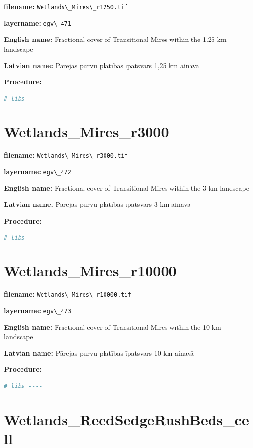\documentclass[
]{book}
\newcommand{\passthrough}[1]{#1}
\begin{document}
\textbf{filename:} \passthrough{\lstinline!Wetlands\_Mires\_r1250.tif!}

\textbf{layername:} \passthrough{\lstinline!egv\_471!}

\textbf{English name:} Fractional cover of Transitional Mires within the 1.25 km landscape

\textbf{Latvian name:} Pārejas purvu platības īpatsvars 1,25 km ainavā

\textbf{Procedure:}

\begin{lstlisting}[language=R]
# libs ----
\end{lstlisting}

\section{Wetlands\_Mires\_r3000}\label{ch06.472}

\textbf{filename:} \passthrough{\lstinline!Wetlands\_Mires\_r3000.tif!}

\textbf{layername:} \passthrough{\lstinline!egv\_472!}

\textbf{English name:} Fractional cover of Transitional Mires within the 3 km landscape

\textbf{Latvian name:} Pārejas purvu platības īpatsvars 3 km ainavā

\textbf{Procedure:}

\begin{lstlisting}[language=R]
# libs ----
\end{lstlisting}

\section{Wetlands\_Mires\_r10000}\label{ch06.473}

\textbf{filename:} \passthrough{\lstinline!Wetlands\_Mires\_r10000.tif!}

\textbf{layername:} \passthrough{\lstinline!egv\_473!}

\textbf{English name:} Fractional cover of Transitional Mires within the 10 km landscape

\textbf{Latvian name:} Pārejas purvu platības īpatsvars 10 km ainavā

\textbf{Procedure:}

\begin{lstlisting}[language=R]
# libs ----
\end{lstlisting}

\section{Wetlands\_ReedSedgeRushBeds\_cell}\label{ch06.474}
\end{document}
